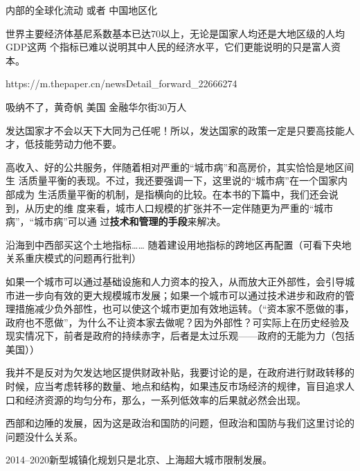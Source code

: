 内部的全球化流动 或者 中国地区化




世界主要经济体基尼系数基本已达70以上，无论是国家人均还是大地区级的人均GDP这两
个指标已难以说明其中人民的经济水平，它们更能说明的只是富人资本。

https://m.thepaper.cn/newsDetail_forward_22666274

吸纳不了，黄奇帆 美国 金融华尔街30万人



发达国家才不会以天下大同为己任呢！所以，发达国家的政策一定是只要高技能人才，低技能劳动力他不要。

高收入、好的公共服务，伴随着相对严重的“城市病”和高房价，其实恰恰是地区间生
活质量平衡的表现。不过，我还要强调一下，这里说的“城市病”在一个国家内部成为
生活质量平衡的机制，是指横向的比较。在本书的下篇中，我们还会说到，从历史的维
度来看，城市人口规模的扩张并不一定伴随更为严重的“城市病”，“城市病”可以通
过\textbf{技术和管理的手段}来解决。


沿海到中西部买这个土地指标…… 随着建设用地指标的跨地区再配置（可看下央地关系重庆模式的问题再行批判）






如果一个城市可以通过基础设施和人力资本的投入，从而放大正外部性，会引导城市进一步向有效的更大规模城市发展；如果一个城市可以通过技术进步和政府的管理措施减少负外部性，也可以使这个城市更加有效地运转。（“资本家不愿做的事，政府也不愿做”，为什么不让资本家去做呢？因为外部性？可实际上在历史经验及现实情况下，前者是政府的持续赤字，后者是太过乐观——政府的无能为力（包括美国））

我并不是反对为欠发达地区提供财政补贴，我要讨论的是，在政府进行财政转移的时候，应当考虑转移的数量、地点和结构，如果违反市场经济的规律，盲目追求人口和经济资源的均匀分布，那么，一系列低效率的后果就必然会出现。

西部和边陲的发展，因为这是政治和国防的问题，但政治和国防与我们这里讨论的问题没什么关系。

2014--2020新型城镇化规划只是北京、上海超大城市限制发展。

